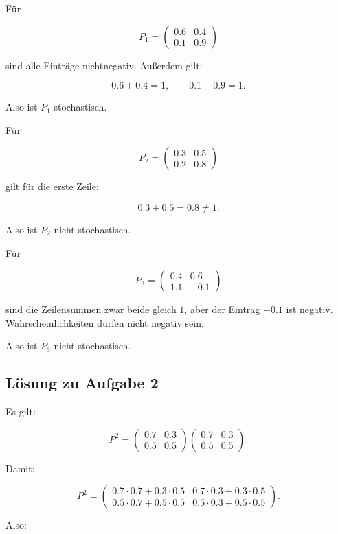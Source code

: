 \documentclass[11pt,a4paper]{article}
\begin{document}
Für

\[
P_1 =
\begin{pmatrix}
0.6 & 0.4 \\
0.1 & 0.9
\end{pmatrix}
\]

sind alle Einträge nichtnegativ. Außerdem gilt:

\[
0.6+0.4=1,
\qquad
0.1+0.9=1.
\]

Also ist $P_1$ stochastisch.

Für

\[
P_2 =
\begin{pmatrix}
0.3 & 0.5 \\
0.2 & 0.8
\end{pmatrix}
\]

gilt für die erste Zeile:

\[
0.3+0.5=0.8 \neq 1.
\]

Also ist $P_2$ nicht stochastisch.

Für

\[
P_3 =
\begin{pmatrix}
0.4 & 0.6 \\
1.1 & -0.1
\end{pmatrix}
\]

sind die Zeilensummen zwar beide gleich $1$, aber der Eintrag $-0.1$ ist negativ. Wahrscheinlichkeiten dürfen nicht negativ sein.

Also ist $P_3$ nicht stochastisch.

\subsection*{Lösung zu Aufgabe 2}

Es gilt:

\[
P^2 =
\begin{pmatrix}
0.7 & 0.3 \\
0.5 & 0.5
\end{pmatrix}
\begin{pmatrix}
0.7 & 0.3 \\
0.5 & 0.5
\end{pmatrix}.
\]

Damit:

\[
P^2 =
\begin{pmatrix}
0.7\cdot 0.7 + 0.3\cdot 0.5
&
0.7\cdot 0.3 + 0.3\cdot 0.5
\\
0.5\cdot 0.7 + 0.5\cdot 0.5
&
0.5\cdot 0.3 + 0.5\cdot 0.5
\end{pmatrix}.
\]

Also:
\end{document}
